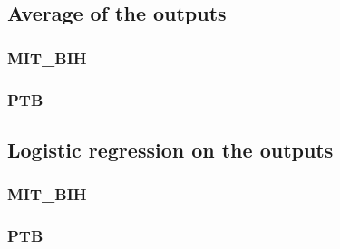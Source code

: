 \documentclass[11pt]{scrartcl}
\begin{document}
\subsection{Average of the outputs}
\subsubsection{MIT\_BIH}

\subsubsection{PTB}

\subsection{Logistic regression on the outputs}
\subsubsection{MIT\_BIH}

\subsubsection{PTB}
\end{document}
